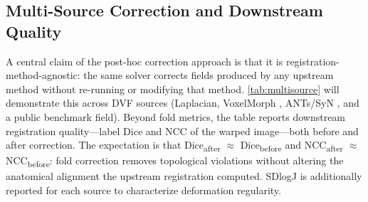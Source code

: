 \documentclass[lettersize,journal]{IEEEtran}
\begin{document}
\subsection{Multi-Source Correction and Downstream Quality}
\label{sec:multisource}

A central claim of the post-hoc correction approach is that it is registration-method-agnostic: the same solver corrects fields produced by any upstream method without re-running or modifying that method. \autoref{tab:multisource} will demonstrate this across DVF sources (Laplacian, VoxelMorph \cite{VoxelMorph2019}, ANTs/SyN \cite{AVANTS200826}, and a public benchmark field). Beyond fold metrics, the table reports downstream registration quality—label Dice and NCC of the warped image—both before and after correction. The expectation is that Dice\textsubscript{after} $\approx$ Dice\textsubscript{before} and NCC\textsubscript{after} $\approx$ NCC\textsubscript{before}: fold correction removes topological violations without altering the anatomical alignment the upstream registration computed. SDlogJ is additionally reported for each source to characterize deformation regularity.

\begin{table}[ht]\centering
\caption{TODO (deferred result): Multi-source correction results. Rows are DVF sources (Laplacian, VoxelMorph, ANTs/SyN, public benchmark). Columns: geometric feasibility, L1 deviation, \%$J{\leq}0$ before/after, SDlogJ before/after, label Dice before/after, NCC before/after.}
\label{tab:multisource}
\end{table}
\end{document}
